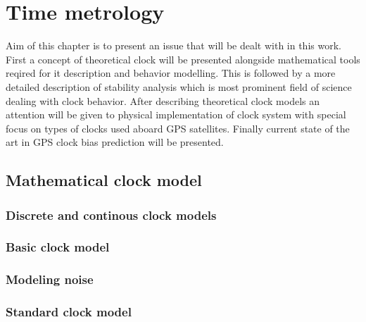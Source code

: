 \chapter{Time metrology}
Aim of this chapter is to present an issue that will be dealt with in this work.
First a concept of theoretical clock will be presented alongside mathematical tools reqired
for it description and behavior modelling.
This is followed by a more detailed description of stability analysis which is most prominent
field of science dealing with clock behavior.
After describing theoretical clock models an attention will be given to physical implementation
of clock system with special focus on types of clocks used aboard GPS satellites.
Finally current state of the art in GPS clock bias prediction will be presented.

\section{Mathematical clock model}

\subsection{Discrete and continous clock models}

\subsection{Basic clock model}

\subsection{Modeling noise}

\subsection{Standard clock model}


